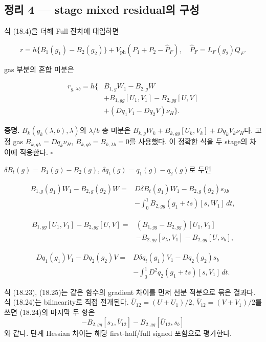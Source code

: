 \hypertarget{uxc815uxb9ac-4-stage-mixed-residualuxc758-uxad6cuxc131}{%
\subsection{정리 4 --- stage mixed residual의
구성}\label{uxc815uxb9ac-4-stage-mixed-residualuxc758-uxad6cuxc131}}

식 (18.4)을 더해 Full 잔차에 대입하면

\[
r=h\{B_1(g_1)-B_2(g_2)\}
+V_{\mathrm{ph}}(P_1+P_2-\widehat P_F),
\quad
\widehat P_F=L_F(g_2)Q_F.
\tag{18.21}
\]

gas 부분의 혼합 미분은

\[
\boxed{\begin{aligned}
r_{g,\lambda b}=h\{&
B_{1,g}W_1-B_{2,g}W\\
&+B_{1,gg}[U_1,V_1]-B_{2,gg}[U,V]\\
&+(Dq_1V_1-Dq_2V)\nu_H\}.
\end{aligned}}
\tag{18.22}
\]

\textbf{증명.} \(B_k(g_k(\lambda,b),\lambda)\)의 \(\lambda/b\) 총 미분은
\(B_{k,g}W_k+B_{k,gg}[U_k,V_k]+Dq_kV_k\nu_H\)다. 고정 gas
\(B_{k,g\lambda}=Dq_k\nu_H\), \(B_{k,gb}=B_{k,\lambda b}=0\)를 사용했다.
이 정확한 식을 두 stage의 차이에 적용한다. \(\square\)

\(\delta B_t(g)=B_1(g)-B_2(g)\), \(\delta q_t(g)=q_1(g)-q_2(g)\)로 두면

\[
\boxed{\begin{aligned}
B_{1,g}(g_1)W_1-B_{2,g}(g_2)W
={}&D\delta B_t(g_1)W_1-B_{2,g}(g_2)s_{\lambda b}\\
&-\int_0^1B_{2,gg}(g_1+ts)[s,W_1]\,dt,
\end{aligned}}
\tag{18.23}
\]

\[
\boxed{\begin{aligned}
B_{1,gg}[U_1,V_1]-B_{2,gg}[U,V]
={}&(B_{1,gg}-B_{2,gg})[U_1,V_1]\\
&-B_{2,gg}[s_\lambda,V_1]-B_{2,gg}[U,s_b],
\end{aligned}}
\tag{18.24}
\]

\[
\boxed{\begin{aligned}
Dq_1(g_1)V_1-Dq_2(g_2)V
={}&D\delta q_t(g_1)V_1-Dq_2(g_2)s_b\\
&-\int_0^1D^2q_2(g_1+ts)[s,V_1]\,dt.
\end{aligned}}
\tag{18.25}
\]

식 (18.23), (18.25)는 같은 함수의 gradient 차이를 먼저 선분 적분으로
묶은 결과다. 식 (18.24)는 bilinearity로 직접 전개된다.
\(\bar U_{12}=(U+U_1)/2\), \(\bar V_{12}=(V+V_1)/2\)를 쓰면 (18.24)의
마지막 두 항은 \[
-B_{2,gg}[s_\lambda,\bar V_{12}]
-B_{2,gg}[\bar U_{12},s_b]
\tag{18.26}
\] 와 같다. 단계 Hessian 차이는 해당 first-half/full signed 포함으로
평가한다.

